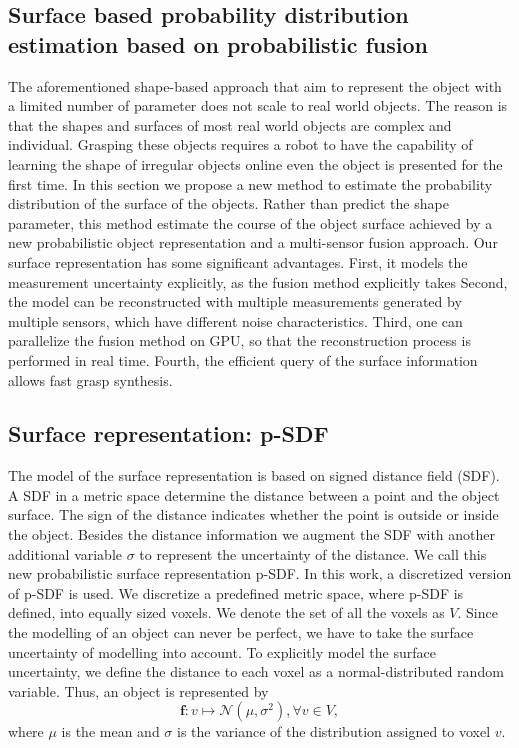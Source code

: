 \subsection{Surface based probability distribution estimation based on probabilistic fusion}
The aforementioned shape-based approach that aim to represent the object with a limited number of parameter does not scale to real world objects. The reason is that the shapes and surfaces of most real world objects are complex and individual. Grasping these objects requires a robot to have the capability of learning the shape of irregular objects online even the object is presented for the first time. In this section we propose a new method to estimate the probability distribution of the surface of the objects. Rather than predict the shape parameter, this method estimate the course of the object surface achieved by a new probabilistic object representation and a multi-sensor fusion approach. Our surface representation has some significant advantages. First, it models the measurement uncertainty explicitly, as the fusion method explicitly takes Second, the model can be reconstructed with multiple measurements generated by multiple sensors, which have different noise characteristics. Third, one can parallelize the fusion method on GPU, so that the reconstruction
process is performed in real time. Fourth, the efficient query of the surface information allows fast grasp synthesis.

\subsection{Surface representation: p-SDF}
The model of the surface representation is based on signed distance field (SDF). A SDF in a metric space determine the distance between a point and the object surface. The sign of the distance indicates whether the point is outside or inside the object. Besides the distance information we augment the SDF with another additional variable $\sigma$ to represent the uncertainty of the distance. We call this new probabilistic surface representation p-SDF. In this work, a discretized version of p-SDF is used. We discretize a predefined metric space, where p-SDF is defined, into equally sized voxels. We denote the set of all the voxels as $V$. Since the modelling of an object can never be perfect, we have to take the surface uncertainty of modelling into account. To explicitly model the surface uncertainty, we define the distance to each voxel as a normal-distributed random variable. Thus, an object is represented by  
\begin{equation}
\bm{f}: v \mapsto \mathcal{N}(\mu, \sigma^2),  \forall v \in  V ,
\end{equation}
where $\mu$ is the mean and $\sigma$ is the variance of the distribution assigned to voxel $v$.  


